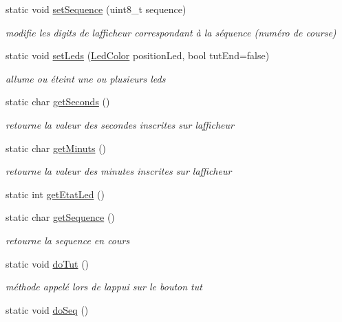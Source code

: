 \begin{DoxyCompactItemize}
static void \hyperlink{class_salf_box_ihm_a5952f1c4c02a795f38b5630ac7a60c55}{set\+Sequence} (uint8\+\_\+t sequence)
\begin{DoxyCompactList}\small\item\em modifie les digits de l\textquotesingle{}afficheur correspondant à la séquence (numéro de course) \end{DoxyCompactList}\item 
static void \hyperlink{class_salf_box_ihm_a5364f829f08a56c32edfe47d206f6230}{set\+Leds} (\hyperlink{_led_color_8h_a81ea3de5b76240d46410f8b9acf4cbde}{Led\+Color} position\+Led, bool tut\+End=false)
\begin{DoxyCompactList}\small\item\em allume ou éteint une ou plusieurs leds \end{DoxyCompactList}\item 
static char \hyperlink{class_salf_box_ihm_afb383d3a23e457fc57bcca36526801f1}{get\+Seconds} ()
\begin{DoxyCompactList}\small\item\em retourne la valeur des secondes inscrites sur l\textquotesingle{}afficheur \end{DoxyCompactList}\item 
static char \hyperlink{class_salf_box_ihm_a3ffe43dd9ae6a29f4d6bb7871ef3cf45}{get\+Minuts} ()
\begin{DoxyCompactList}\small\item\em retourne la valeur des minutes inscrites sur l\textquotesingle{}afficheur \end{DoxyCompactList}\item 
static int \hyperlink{class_salf_box_ihm_aabf6bdbc268b0ab0097562284ad533fa}{get\+Etat\+Led} ()
\item 
static char \hyperlink{class_salf_box_ihm_accd0e647513951730e0465874a8384ea}{get\+Sequence} ()
\begin{DoxyCompactList}\small\item\em retourne la sequence en cours \end{DoxyCompactList}\item 
static void \hyperlink{class_salf_box_ihm_ae665d726b6f7ad5bf72d1fc26893abf5}{do\+Tut} ()
\begin{DoxyCompactList}\small\item\em méthode appelé lors de l\textquotesingle{}appui sur le bouton tut \end{DoxyCompactList}\item 
static void \hyperlink{class_salf_box_ihm_a1ad2fe50aaa00fecd8eb29cd605c91e4}{do\+Seq} ()

\end{DoxyCompactItemize}

